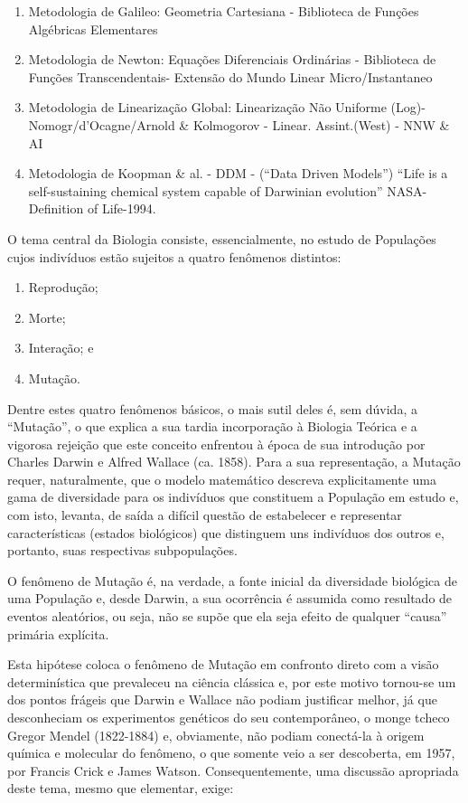 \begin{enumerate}
\item Metodologia de Galileo: Geometria Cartesiana - Biblioteca de Funções Algébricas Elementares
\item Metodologia de Newton: Equações Diferenciais Ordinárias - Biblioteca de Funções Transcendentais- Extensão do Mundo Linear Micro/Instantaneo
\item Metodologia de Linearização Global: Linearização Não Uniforme (Log)-Nomogr/d’Ocagne/Arnold \& Kolmogorov - Linear. Assint.(West) - NNW \& AI
\item Metodologia de Koopman \& al. - DDM - (``Data Driven Models'') ``Life is a self-sustaining chemical system capable of Darwinian evolution'' NASA-Definition of Life-1994.
\end{enumerate}

O tema central da Biologia consiste, essencialmente, no estudo de Populações cujos indivíduos estão sujeitos a quatro fenômenos distintos:

\begin{enumerate}
\item Reprodução;
\item Morte;
\item Interação; e
\item Mutação.
\end{enumerate}

    Dentre estes quatro fenômenos básicos, o mais sutil deles é, sem dúvida, a ``Mutação'', o que explica a sua tardia incorporação à Biologia Teórica e a vigorosa rejeição que este conceito enfrentou à época de sua introdução por Charles Darwin e Alfred Wallace (ca. 1858). Para a sua representação, a Mutação requer, naturalmente, que o modelo matemático descreva explicitamente uma gama de diversidade para os indivíduos que constituem a População em estudo e, com isto, levanta, de saída a difícil questão de estabelecer e representar características (estados biológicos) que distinguem uns indivíduos dos outros e, portanto, suas respectivas subpopulações.

    O fenômeno de Mutação é, na verdade, a fonte inicial da diversidade biológica de uma População e, desde Darwin, a sua ocorrência é assumida como resultado de eventos aleatórios, ou seja, não se supõe que ela seja efeito de qualquer ``causa'' primária explícita.

    Esta hipótese coloca o fenômeno de Mutação em confronto direto com a visão determinística que prevaleceu na ciência clássica e, por este motivo tornou-se um dos pontos frágeis que Darwin e Wallace não podiam justificar melhor, já que desconheciam os experimentos genéticos do seu contemporâneo, o monge tcheco Gregor Mendel (1822-1884) e, obviamente, não podiam conectá-la à origem química e molecular do fenômeno, o que somente veio a ser descoberta, em 1957, por Francis Crick e James Watson. Consequentemente, uma discussão apropriada deste tema, mesmo que elementar, exige:
    

